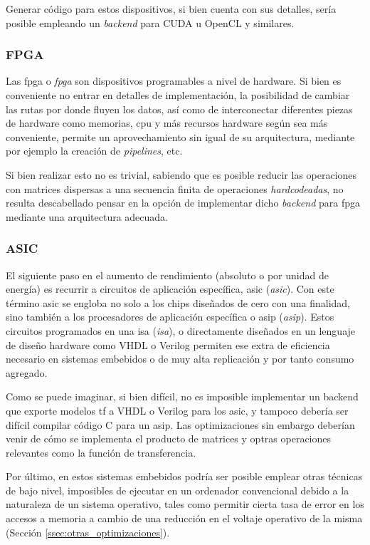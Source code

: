 Generar código para estos dispositivos, si bien cuenta con sus detalles, sería posible empleando un \textit{backend} para CUDA u OpenCL y similares.

\subsubsection{FPGA}
\label{sssec:heterogeneas_fpga}
Las \acrshort{fpga} o \textit{\acrlong{fpga}} son dispositivos programables a nivel de hardware. Si bien es conveniente no entrar en detalles de implementación, la posibilidad de cambiar las rutas por donde fluyen los datos, así como de interconectar diferentes piezas de hardware como memorias, \acrshort{cpu} y más recursos hardware según sea más conveniente, permite un aprovechamiento sin igual de su arquitectura, mediante por ejemplo la creación de \textit{pipelines}, etc.

Si bien realizar esto no es trivial, sabiendo que es posible reducir las operaciones con matrices dispersas a una secuencia finita de operaciones \textit{hardcodeadas}, no resulta descabellado pensar en la opción de implementar dicho \textit{backend} para \acrshort{fpga} mediante una arquitectura adecuada.

\subsubsection{ASIC}
\label{sssec:heterogeneas_asic}
El siguiente paso en el aumento de rendimiento (absoluto o por unidad de energía) es recurrir a circuitos de aplicación específica, \acrshort{asic} (\textit{\acrlong{asic}}). Con este término \acrshort{asic} se engloba no solo a los chips diseñados de cero con una finalidad, sino también a los procesadores de aplicación específica o \acrshort{asip} (\textit{\acrlong{asip}}). Estos circuitos programados en una \acrshort{isa} (\textit{\acrlong{isa}}), o directamente diseñados en un lenguaje de diseño hardware como VHDL o Verilog permiten ese extra de eficiencia necesario en sistemas embebidos o de muy alta replicación y por tanto consumo agregado.

Como se puede imaginar, si bien difícil, no es imposible implementar un backend que exporte modelos \acrlong{tf} a VHDL o Verilog para los \acrshort{asic}, y tampoco debería ser difícil compilar código C para un \acrshort{asip}. Las optimizaciones sin embargo deberían venir de cómo se implementa el producto de matrices y optras operaciones relevantes como la función de transferencia.

Por último, en estos sistemas embebidos podría ser posible emplear otras técnicas de bajo nivel, imposibles de ejecutar en un ordenador convencional debido a la naturaleza de un sistema operativo, tales como permitir cierta tasa de error en los accesos a memoria a cambio de una reducción en el voltaje operativo de la misma (Sección \ref{ssec:otras_optimizaciones}).